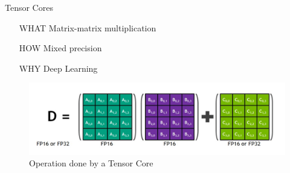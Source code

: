 \begin{frame}{Tensor Cores}
	

		\begin{center}
			\begin{minipage}{0.5\textwidth}
				\centering
				\begin{itemize}
					\item[WHAT] Matrix-matrix multiplication
					\item[HOW] Mixed precision
					\item[WHY] Deep Learning
				\end{itemize}
			\end{minipage}

			\begin{figure}
				\includegraphics[width=\textwidth]{tensor_core_op}
				\caption{Operation done by a Tensor Core}
			\end{figure}
		\end{center}


	

\end{frame}